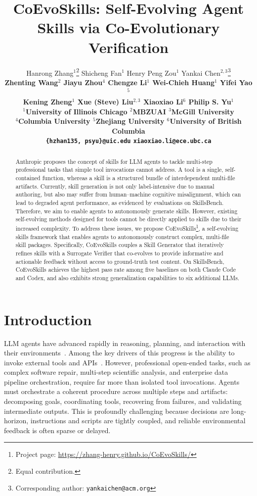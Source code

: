 \documentclass{article}
\title{CoEvoSkills: Self-Evolving Agent Skills via Co-Evolutionary Verification}
\author{%
\hspace{0pt}Hanrong Zhang$^{1}$\thanks{Equal contribution.} \quad
Shicheng Fan$^{1}$\footnotemark[1] \quad
Henry Peng Zou$^{1}$ \quad
Yankai Chen$^{2,3}$\thanks{Corresponding author: \texttt{yankaichen@acm.org}} \\
\hspace{0pt}\bf Zhenting Wang$^{2}$ \quad
Jiayu Zhou$^{4}$ \quad
Chengze Li$^{1}$ \quad
Wei-Chieh Huang$^{1}$ \quad
Yifei Yao$^{5}$ \\
\hspace{0pt}\bf Kening Zheng$^{1}$ \quad
Xue (Steve) Liu$^{2,3}$ \quad
Xiaoxiao Li$^{6}$ \quad
Philip S. Yu$^{1}$ \\[6pt]
\hspace{0pt}\mdseries
$^{1}$University of Illinois Chicago \quad
$^{2}$MBZUAI \quad
$^{3}$McGill University \\
$^{4}$Columbia University \quad
$^{5}$Zhejiang University \quad
$^{6}$University of British Columbia \\[4pt]
\texttt{\{hzhan135, psyu\}@uic.edu} \quad
\texttt{xiaoxiao.li@ece.ubc.ca}
}
\begin{document}
\ifcolmsubmission
\linenumbers
\fi

\maketitle

\begin{abstract}
Anthropic proposes the concept of skills for LLM agents to tackle multi-step professional tasks that simple tool invocations cannot address. A tool is a single, self-contained function, whereas a skill is a structured bundle of interdependent multi-file artifacts. Currently, skill generation is not only label-intensive due to manual authoring, but also may suffer from human--machine cognitive misalignment, which can lead to degraded agent performance, as evidenced by evaluations on SkillsBench. Therefore, we aim to enable agents to autonomously generate skills. However, existing self-evolving methods designed for tools cannot be directly applied to skills due to their increased complexity. To address these issues, we propose CoEvoSkills\footnote{Project page: \url{https://zhang-henry.github.io/CoEvoSkills/}}, a self-evolving skills framework that enables agents to autonomously construct complex, multi-file skill packages. Specifically, CoEvoSkills couples a Skill Generator that iteratively refines skills with a Surrogate Verifier that co-evolves to provide informative and actionable feedback without access to ground-truth test content. On SkillsBench, CoEvoSkills achieves the highest pass rate among five baselines on both Claude Code and Codex, and also exhibits strong generalization capabilities to six additional LLMs.
\end{abstract}
\section{Introduction}
\label{sec:intro}

LLM agents have advanced rapidly in reasoning, planning, and interaction with their environments~\citep{zhang2025agent, zou2025llmbasedhumanagentcollaborationinteraction, huang2026rethinkingmemorymechanismsfoundation, zou2026userschangemindevaluating, huang2025deepresearchguard, min2025qucoragquantifyinguncertaintypretraining, min2025unihgkr}. Among the key drivers of this progress is the ability to invoke external tools and APIs~\citep{schick2023toolformer, qin2024toolllm, patil2023gorilla}. However, professional open-ended tasks, such as complex software repair, multi-step scientific analysis, and enterprise data pipeline orchestration, require far more than isolated tool invocations. Agents must orchestrate a coherent procedure across multiple steps and artifacts: decomposing goals, coordinating tools, recovering from failures, and validating intermediate outputs. This is profoundly challenging because decisions are long-horizon, instructions and scripts are tightly coupled, and reliable environmental feedback is often sparse or delayed.
\end{document}
